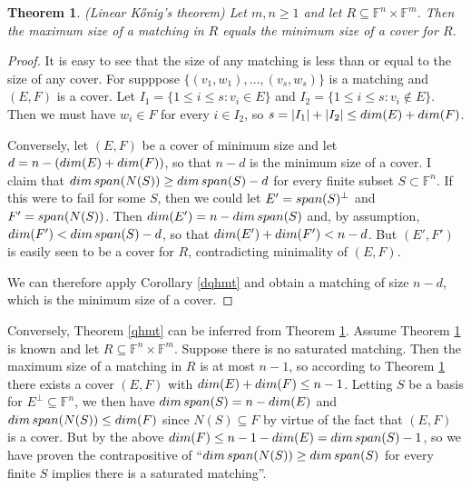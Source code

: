 \documentclass[10pt,a4paper]{amsart}
\newtheorem{thm}{Theorem}[section]
\begin{document}
\begin{thm}\label{qkt} (Linear Kőnig's theorem)
Let $m,n \geq 1$ and let $R \subseteq \mathbb{F}^n \times \mathbb{F}^m$. Then the maximum size of a matching in $R$ equals the minimum size of a cover for $R$.
\end{thm}

\begin{proof}
It is easy to see that the size of any matching is less than or equal to the size of any cover. For supppose $\{(v_1, w_1), \ldots, (v_s, w_s)\}$ is a matching and $(E,F)$ is a cover. Let $I_1 = \{1 \leq i \leq s: v_i \in E\}$ and $I_2 = \{1 \leq i \leq s: v_i \not\in E\}$. Then we must have $w_i \in F$ for every $i \in I_2$, so $s = |I_1| + |I_2| \leq {\rm dim}(E) + {\rm dim}(F)$.

Conversely, let $(E,F)$ be a cover of minimum size and let $d = n - ({\rm dim}(E) + {\rm dim}(F))$, so that $n - d$ is the minimum size of a cover. I claim that ${\rm dim}\, {\rm span}(N(S)) \geq {\rm dim}\, {\rm span}(S) - d$ for every finite subset $S \subset \mathbb{F}^n$. If this were to fail for some $S$, then we could let $E' = {\rm span}(S)^\perp$ and $F' = {\rm span}(N(S))$. Then ${\rm dim}(E') = n - {\rm dim}\, {\rm span}(S)$ and, by assumption, ${\rm dim}(F') < {\rm dim}\, {\rm span}(S) - d$, so that
${\rm dim}(E') + {\rm dim}(F') < n-d$. But $(E',F')$ is easily seen to be a cover for $R$, contradicting minimality of $(E,F)$.

We can therefore apply Corollary \ref{dqhmt} and obtain a matching of size $n - d$, which is the minimum size of a cover.
\end{proof}

Conversely, Theorem \ref{qhmt} can be inferred from Theorem \ref{qkt}. Assume Theorem \ref{qkt} is known and let $R \subseteq \mathbb{F}^n \times \mathbb{F}^m$. Suppose there is no saturated matching. Then the maximum size of a matching in $R$ is at most $n - 1$, so according to Theorem \ref{qkt} there exists a cover $(E,F)$ with ${\rm dim}(E) + {\rm dim}(F) \leq n - 1$. Letting $S$ be a basis for $E^\perp \subseteq \mathbb{F}^n$, we then have ${\rm dim}\, {\rm span}(S) = n - {\rm dim}(E)$ and ${\rm dim}\, {\rm span}(N(S)) \leq {\rm dim}(F)$ since $N(S) \subseteq F$ by virtue of the fact that $(E,F)$ is a cover. But by the above ${\rm dim}(F) \leq n - 1 - {\rm dim}(E) = {\rm dim}\, {\rm span}(S) - 1$, so we have proven the contrapositive of ``${\rm dim}\, {\rm span}(N(S)) \geq {\rm dim}\, {\rm span}(S)$ for every finite $S$ implies there is a saturated matching''.
\end{document}
